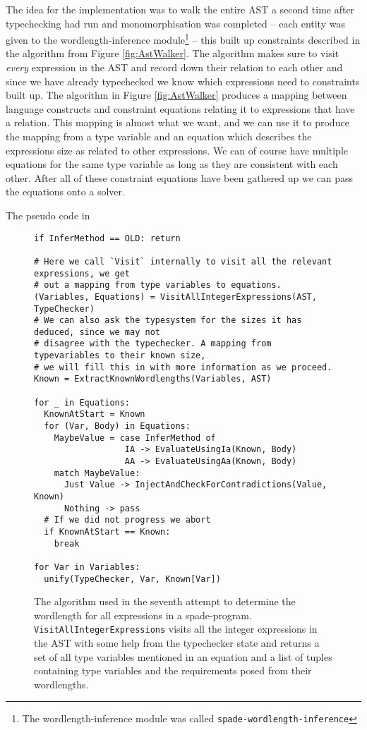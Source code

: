 The idea for the implementation was to walk the entire AST a second time after typechecking had run and monomorphisation was completed -- each entity was given to the wordlength-inference module\cprotect\footnote{The wordlength-inference module was called \verb+spade-wordlength-inference+} -- this built up constraints described in the algorithm from Figure \ref{fig:AstWalker}. The algorithm makes sure to visit \textit{every} expression in the AST and record down their relation to each other and since we have already typechecked we know which expressions need to constraints built up. The algorithm in Figure \ref{fig:AstWalker} produces a mapping between language constructs and constraint equations relating it to expressions that have a relation. This mapping is almost what we want, and we can use it to produce the mapping from a type variable and an equation which describes the expressions size as related to other expressions. We can of course have multiple equations for the same type variable as long as they are consistent with each other. After all of these constraint equations have been gathered up we can pass the equations onto a solver. 

The pseudo code in 

\begin{figure}
\begin{verbatim}
if InferMethod == OLD: return

# Here we call `Visit` internally to visit all the relevant expressions, we get
# out a mapping from type variables to equations.
(Variables, Equations) = VisitAllIntegerExpressions(AST, TypeChecker)
# We can also ask the typesystem for the sizes it has deduced, since we may not
# disagree with the typechecker. A mapping from typevariables to their known size,
# we will fill this in with more information as we proceed.
Known = ExtractKnownWordlengths(Variables, AST)

for _ in Equations:
  KnownAtStart = Known
  for (Var, Body) in Equations:
    MaybeValue = case InferMethod of
                  IA -> EvaluateUsingIa(Known, Body)
                  AA -> EvaluateUsingAa(Known, Body)
    match MaybeValue:
      Just Value -> InjectAndCheckForContradictions(Value, Known)
      Nothing -> pass
  # If we did not progress we abort
  if KnownAtStart == Known:
    break

for Var in Variables:
  unify(TypeChecker, Var, Known[Var])
\end{verbatim}
  \cprotect\caption{The algorithm used in the seventh attempt to determine the wordlength for all expressions in a spade-program. \verb+VisitAllIntegerExpressions+ visits all the integer expressions in the AST with some help from the typechecker state and returns a set of all type variables mentioned in an equation and a list of tuples containing type variables and the requirements posed from their wordlengths.}
\label{fig:WLIAlgo}
\end{figure}

